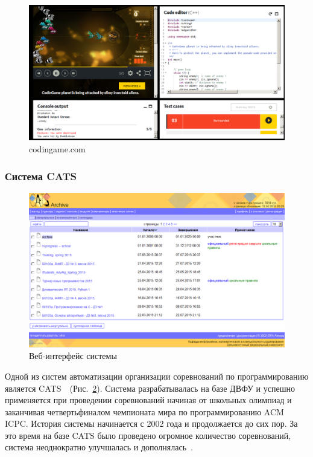 \documentclass{imcs}
\begin{document}
\begin{figure}[htb]
\centering
\includegraphics[width=\textwidth,keepaspectratio]{./img/codingame.png}
\caption{codingame.com}
\label{codingame_screenshot}
\end{figure}
\FloatBarrier

\subsubsection{Система CATS}
\FloatBarrier
\begin{figure}[htb]
\centering
\includegraphics[width=\textwidth,keepaspectratio]{./img/cats_screenshot.png}
\caption{Веб-интерфейс системы}
\label{cats_screenshot}
\end{figure}

Одной из систем автоматизации организации соревнований по программированию является CATS~\cite{cats,rozhkov}~(Рис.~\ref{cats_screenshot}).
Система разрабатывалась на базе ДВФУ и успешно применяется при проведении соревнований начиная от школьных олимпиад и заканчивая четвертьфиналом чемпионата мира по программированию ACM ICPC.
История системы начинается с 2002 года и продолжается до сих пор.
За это время на базе CATS было проведено огромное количество соревнований, система неоднократно улучшалась и дополнялась~\cite{rozhkov,matvienko,konovalova,perepechin,tuphanov,khrapchenkov}.
\end{document}
